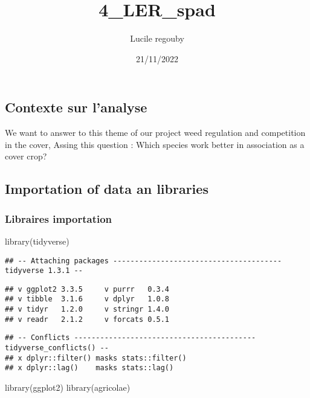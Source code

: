 \documentclass[
]{article}
\title{4\_LER\_spad}
\author{Lucile regouby}
\date{21/11/2022}
\newenvironment{Shaded}{\begin{snugshade}}{\end{snugshade}}
\newcommand{\FunctionTok}[1]{\textcolor[rgb]{0.00,0.00,0.00}{#1}}
\newcommand{\NormalTok}[1]{#1}
\begin{document}
\maketitle

\hypertarget{contexte-sur-lanalyse}{%
\subsection{Contexte sur l'analyse}\label{contexte-sur-lanalyse}}

We want to answer to this theme of our project weed regulation and
competition in the cover, Assing this question : Which species work
better in association as a cover crop?

\hypertarget{importation-of-data-an-libraries}{%
\subsection{Importation of data an
libraries}\label{importation-of-data-an-libraries}}

\hypertarget{libraires-importation}{%
\subsubsection{Libraires importation}\label{libraires-importation}}

\begin{Shaded}
\begin{Highlighting}[]
\FunctionTok{library}\NormalTok{(tidyverse)}
\end{Highlighting}
\end{Shaded}

\begin{verbatim}
## -- Attaching packages --------------------------------------- tidyverse 1.3.1 --
\end{verbatim}

\begin{verbatim}
## v ggplot2 3.3.5     v purrr   0.3.4
## v tibble  3.1.6     v dplyr   1.0.8
## v tidyr   1.2.0     v stringr 1.4.0
## v readr   2.1.2     v forcats 0.5.1
\end{verbatim}

\begin{verbatim}
## -- Conflicts ------------------------------------------ tidyverse_conflicts() --
## x dplyr::filter() masks stats::filter()
## x dplyr::lag()    masks stats::lag()
\end{verbatim}

\begin{Shaded}
\begin{Highlighting}[]
\FunctionTok{library}\NormalTok{(ggplot2)}
\FunctionTok{library}\NormalTok{(agricolae)}
\end{Highlighting}
\end{Shaded}
\end{document}
